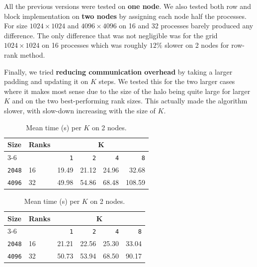 \documentclass[11pt]{article}
\begin{document}
All the previous versions were tested on \textbf{one node}. We also tested both row and block implementation on \textbf{two nodes} by assigning each node half the processes. For size $1024 \times 1024$ and $4096 \times 4096$ on 16 and 32 processes barely produced any difference. The only difference that was not negligible was for the grid $1024 \times 1024$ on 16 processes which was roughly $12\%$ slower on 2 nodes for row-rank method.

Finally, we tried \textbf{reducing communication overhead} by taking a larger padding and updating it on $K$ steps. We tested this for the two larger cases where it makes most sense due to the size of the halo being quite large for larger $K$ and on the two best-performing rank sizes. This actually made the algorithm slower, with slow-down increasing with the size of $K$. 

\begin{table}[H]
    \centering
    \begin{minipage}{0.48\textwidth}
        \centering
        \begin{tabular}{|l|l|r|r|r|r|} \hline
            \cellcolor{blue!10}\textbf{Size} & \cellcolor{blue!10}\textbf{Ranks} & \multicolumn{4}{c|}{\cellcolor{blue!10}\textbf{K}} \\ \cline{3-6}
            \cellcolor{blue!10} & \cellcolor{blue!10} & \cellcolor{blue!20}\texttt{1} & \cellcolor{blue!20}\texttt{2} & \cellcolor{blue!20}\texttt{4} & \cellcolor{blue!20}\texttt{8} \\ \hline
            \cellcolor{blue!20}\texttt{2048} & \cellcolor{blue!20}16 & \cellcolor{green!20}19.49 & 21.12 & 24.96 & \cellcolor{red!20}32.68 \\ \hline
            \cellcolor{blue!20}\texttt{4096} & \cellcolor{blue!20}32 & \cellcolor{green!20}49.98 & 54.86 & 68.48 & \cellcolor{red!20}108.59 \\ \hline
        \end{tabular}
        \caption{Mean time (s) per $K$ on 1 node.}
    \end{minipage}
    \hfill
    \begin{minipage}{0.48\textwidth}
        \centering
            \begin{tabular}{|l|l|r|r|r|r|} \hline
            \cellcolor{blue!10}\textbf{Size} & \cellcolor{blue!10}\textbf{Ranks} & \multicolumn{4}{c|}{\cellcolor{blue!10}\textbf{K}} \\ \cline{3-6}
            \cellcolor{blue!10} & \cellcolor{blue!10} & \cellcolor{blue!20}\texttt{1} & \cellcolor{blue!20}\texttt{2} & \cellcolor{blue!20}\texttt{4} & \cellcolor{blue!20}\texttt{8} \\ \hline
            \cellcolor{blue!20}\texttt{2048} & \cellcolor{blue!20}16 & \cellcolor{green!20}21.21 & 22.56 & 25.30 & \cellcolor{red!20}33.04 \\ \hline
            \cellcolor{blue!20}\texttt{4096} & \cellcolor{blue!20}32 & \cellcolor{green!20}50.73 & 53.94 & 68.50 & \cellcolor{red!20}90.17 \\ \hline
            \end{tabular}
        \caption{Mean time (s) per $K$ on 2 nodes.}
    \end{minipage}
\end{table}
\end{document}
